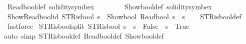 \begin{isabellebody}
\isanewline
{}\isamarkupfalse%
\ Read\isactrlsub b\isactrlsub o\isactrlsub o\isactrlsub l{\isacharunderscore}{\kern0pt}def\ {\isacharbrackleft}{\kern0pt}solidity{\isacharunderscore}{\kern0pt}symbex{\isacharbrackright}{\kern0pt}\isanewline
\ \ \ \ \ \ \ \ Show\isactrlsub b\isactrlsub o\isactrlsub o\isactrlsub l{\isacharunderscore}{\kern0pt}def\ {\isacharbrackleft}{\kern0pt}solidity{\isacharunderscore}{\kern0pt}symbex{\isacharbrackright}{\kern0pt}\isanewline
\isanewline
{}\isamarkupfalse%
\ Show{\isacharunderscore}{\kern0pt}Read{\isacharunderscore}{\kern0pt}bool{\isacharunderscore}{\kern0pt}id{\isacharcolon}{\kern0pt}\ {\isacartoucheopen}STR{\isacharunderscore}{\kern0pt}is{\isacharunderscore}{\kern0pt}bool\ s\ {\isasymLongrightarrow}\ {\isacharparenleft}{\kern0pt}Show\isactrlsub b\isactrlsub o\isactrlsub o\isactrlsub l\ {\isacharparenleft}{\kern0pt}Read\isactrlsub b\isactrlsub o\isactrlsub o\isactrlsub l\ s{\isacharparenright}{\kern0pt}\ {\isacharequal}{\kern0pt}\ s{\isacharparenright}{\kern0pt}{\isacartoucheclose}\isanewline
%
\isadelimproof
\ \ %
\endisadelimproof
%
\isatagproof
{}\isamarkupfalse%
\ STR{\isacharunderscore}{\kern0pt}is{\isacharunderscore}{\kern0pt}bool{\isacharunderscore}{\kern0pt}def\ \isamarkupfalse%
\ fastforce%
\endisatagproof
{\isafoldproof}%
%
\isadelimproof
\isanewline
%
\endisadelimproof
\isanewline
{}\isamarkupfalse%
\ STR{\isacharunderscore}{\kern0pt}is{\isacharunderscore}{\kern0pt}bool{\isacharunderscore}{\kern0pt}split{\isacharcolon}{\kern0pt}\ {\isacartoucheopen}STR{\isacharunderscore}{\kern0pt}is{\isacharunderscore}{\kern0pt}bool\ s\ {\isasymLongrightarrow}\ s\ {\isacharequal}{\kern0pt}\ {\isacharprime}{\kern0pt}{\isacharprime}{\kern0pt}False{\isacharprime}{\kern0pt}{\isacharprime}{\kern0pt}\ {\isasymor}\ s\ {\isacharequal}{\kern0pt}\ {\isacharprime}{\kern0pt}{\isacharprime}{\kern0pt}True{\isacharprime}{\kern0pt}{\isacharprime}{\kern0pt}{\isacartoucheclose}\isanewline
%
\isadelimproof
\ \ %
\endisadelimproof
%
\isatagproof
{}\isamarkupfalse%
{\isacharparenleft}{\kern0pt}auto\ simp{\isacharcolon}{\kern0pt}\ STR{\isacharunderscore}{\kern0pt}is{\isacharunderscore}{\kern0pt}bool{\isacharunderscore}{\kern0pt}def\ Read\isactrlsub b\isactrlsub o\isactrlsub o\isactrlsub l{\isacharunderscore}{\kern0pt}def\ Show\isactrlsub b\isactrlsub o\isactrlsub o\isactrlsub l{\isacharunderscore}{\kern0pt}def{\isacharparenright}{\kern0pt}%
\endisatagproof
{\isafoldproof}%
%
\isadelimproof
\isanewline
%
\endisadelimproof
\isanewline
{}\isamarkupfalse%

\end{isabellebody}
